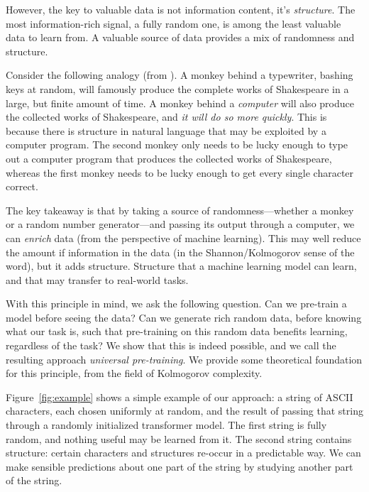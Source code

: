 \documentclass{article} %
\begin{document}
However, the key to valuable data is not information content, it's \emph{structure}. The most information-rich signal, a fully random one, is among the least valuable data to learn from. A valuable source of data provides a mix of randomness and structure.

Consider the following analogy (from \cite{}). A monkey behind a typewriter, bashing keys at random, will famously produce the complete works of Shakespeare in a large, but finite amount of time. A monkey behind a \emph{computer} will also produce the collected works of Shakespeare, and \emph{it will do so more quickly}. This is because there is structure in natural language that may be exploited by a computer program. The second monkey only needs to be lucky enough to type out a computer program that produces the collected works of Shakespeare, whereas the first monkey needs to be lucky enough to get every single character correct.

The key takeaway is that by taking a source of randomness---whether a monkey or a random number generator---and passing its output through a computer, we can \emph{enrich} data (from the perspective of machine learning). This may well reduce the amount if information in the data (in the Shannon/Kolmogorov sense of the word), but it adds structure. Structure that a machine learning model can learn, and that may transfer to real-world tasks.

With this principle in mind, we ask the following question. Can we pre-train a model before seeing the data? Can we generate rich random data, before knowing what our task is, such that pre-training on this random data benefits learning, regardless of the task? We show that this is indeed possible, and we call the resulting approach \emph{universal pre-training}. We provide some theoretical foundation for this principle, from the field of Kolmogorov complexity.

Figure~\ref{fig:example} shows a simple example of our approach: a string of ASCII characters, each chosen uniformly at random, and the result of passing that string through a randomly initialized transformer model. The first string is fully random, and nothing useful may be learned from it. The second string contains structure: certain characters and structures re-occur in a predictable way. We can make sensible predictions about one part of the string by studying another part of the string. 
\end{document}
